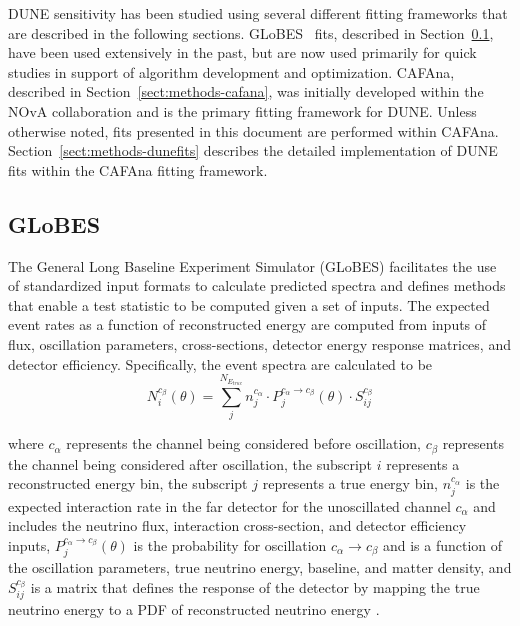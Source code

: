 DUNE sensitivity has been studied using several different fitting frameworks that are described in the following sections. GLoBES~\cite{Huber:2004ka,Huber:2007ji} fits, described in Section~\ref{sect:methods-globes}, have been used extensively in the past, but are now used primarily for quick studies in support of algorithm development and optimization. CAFAna, described in Section~\ref{sect:methods-cafana}, was initially developed within the NOvA collaboration and is the primary fitting framework for DUNE. Unless otherwise noted, fits presented in this document are performed within CAFAna. Section~\ref{sect:methods-dunefits} describes the detailed implementation of DUNE fits within the CAFAna fitting framework.

\subsection{GLoBES}
\label{sect:methods-globes}
The General Long Baseline Experiment Simulator (GLoBES)\cite{Huber:2004ka,Huber:2007ji} facilitates the use of standardized input formats to calculate predicted spectra and defines methods that enable a test statistic to be computed given a set of inputs. The expected event rates as a function of reconstructed energy are computed from inputs of flux, oscillation parameters, cross-sections, detector energy response matrices, and detector efficiency. Specifically, the event spectra are calculated to be
\begin{equation}
    N_i^{c_{\beta}}(\theta) = \sum_j^{N_{E_{true}}} n_j^{c_{\alpha}} \cdot P_j^{c_{\alpha} \rightarrow c_{\beta}}(\theta) \cdot S_{ij}^{c_{\beta}}
\end{equation}

where $c_{\alpha}$ represents the channel being considered before oscillation, $c_{\beta}$ represents the channel being considered after oscillation, the subscript $i$ represents a reconstructed energy bin, the subscript $j$ represents a true energy bin, $n_j^{c_{\alpha}}$ is the expected interaction rate in the far detector for the unoscillated channel $c_{\alpha}$ and includes the neutrino flux, interaction cross-section, and detector efficiency inputs, $P_j^{c_{\alpha} \rightarrow c_{\beta}}(\theta)$ is the probability for oscillation $c_{\alpha} \rightarrow c_{\beta}$ and is a function of the oscillation parameters, true neutrino energy, baseline, and matter density, and $S_{ij}^{c_{\beta}}$ is a matrix that defines the response of the detector by mapping the true neutrino energy to a PDF of reconstructed neutrino energy . 

